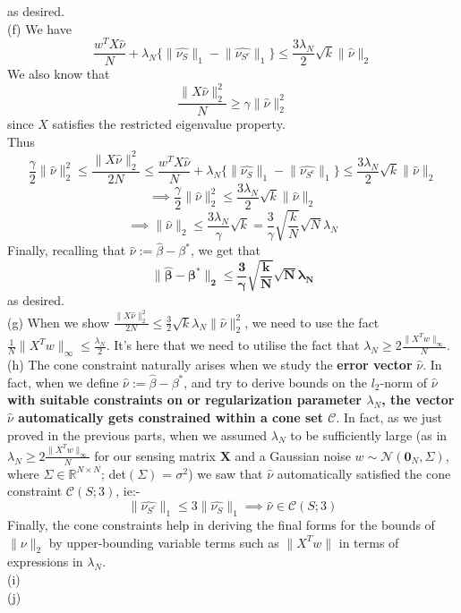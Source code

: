 \documentclass[a4paper,11pt]{article}
\numberwithin{definition}{section}
\numberwithin{mytheorem}{subsection}
\begin{document}
as desired.\\
(f) We have 
$$\frac{w^TX\widehat{\nu}}{N} + \lambda_N\{\lVert\widehat{\nu_S}\rVert_1 - \lVert\widehat{\nu_{S^c}}\rVert_1\} \leq \frac{3\lambda_N}{2}\sqrt{k}\lVert\widehat{\nu}\rVert_2$$
We also know that 
$$\frac{\lVert X\widehat{\nu}\rVert_2^2}{N}\geq \gamma\lVert\widehat{\nu}\rVert_2^2$$
since $X$ satisfies the restricted eigenvalue property.\\
Thus
$$\frac{\gamma}{2}\lVert\widehat{\nu}\rVert_2^2\leq\frac{\lVert X\widehat{\nu}\rVert_2^2}{2N}\leq\frac{w^TX\widehat{\nu}}{N} + \lambda_N\{\lVert\widehat{\nu_S}\rVert_1 - \lVert\widehat{\nu_{S^c}}\rVert_1\}\leq\frac{3\lambda_N}{2}\sqrt{k}\lVert\widehat{\nu}\rVert_2$$
$$\implies \frac{\gamma}{2}\lVert\widehat{\nu}\rVert_2^2\leq\frac{3\lambda_N}{2}\sqrt{k}\lVert\widehat{\nu}\rVert_2$$
$$\implies \lVert\widehat{\nu}\rVert_2\leq\frac{3\lambda_N}{\gamma}\sqrt{k} = \frac{3}{\gamma}\sqrt{\frac{k}{N}}\sqrt{N}\lambda_N$$
Finally, recalling that $\widehat{\nu} := \widehat{\beta} - \beta^*$, we get that 
$$\boldsymbol{\lVert\widehat{\beta} - \beta^*\rVert_2\leq\frac{3}{\gamma}\sqrt{\frac{k}{N}}\sqrt{N}\lambda_N}$$
as desired.\\
(g) When we show $\frac{\lVert X\widehat{\nu}\rVert^2_2}{2N}\leq \frac{3}{2}\sqrt{k}\lambda_N\lVert\widehat{\nu}\rVert_2^2$, we need to use the fact $\frac{1}{N}\lVert X^Tw\rVert_{\infty}\leq\frac{\lambda_N}{2}$. It's here that we need to utilise the fact that $\lambda_N \geq 2\frac{\lVert X^Tw\rVert_{\infty}}{N}$.\\
(h) The cone constraint naturally arises when we study the \textbf{error vector} $\widehat{\nu}$. In fact, when we define $\widehat{\nu} := \widehat{\beta} - \beta^*$, and try to derive bounds on the $l_2$-norm of $\widehat{\nu}$ \textbf{with suitable constraints on or regularization parameter $\lambda_N$, the vector $\widehat{\nu}$ automatically gets constrained within a cone set $\mathcal{C}$}. In fact, as we just proved in the previous parts, when we assumed $\lambda_N$ to be sufficiently large (as in $\lambda_N \geq 2\frac{\lVert X^Tw\rVert_{\infty}}{N}$ for our sensing matrix $\boldsymbol{X}$ and a Gaussian noise $w\sim\mathcal{N}(\mathbf{0}_N, \Sigma)$, where $\Sigma\in\mathbb{R}^{N\times N}$; det$(\Sigma)$ = $\sigma^2$) we saw that $\widehat{\nu}$ automatically satisfied the cone constraint $\mathcal{C}(S; 3)$, ie:- 
$$\lVert\widehat{\nu_{S^c}}\rVert_1\leq 3\lVert\widehat{\nu_{S}}\rVert_1\implies\widehat{\nu}\in\mathcal{C}(S;3)$$
Finally, the cone constraints help in deriving the final forms for the bounds of $\lVert\nu\rVert_2$ by upper-bounding variable terms such as $\lVert X^Tw\rVert$ in terms of expressions in $\lambda_N$.\\
(i)\\
(j)
\end{document}
